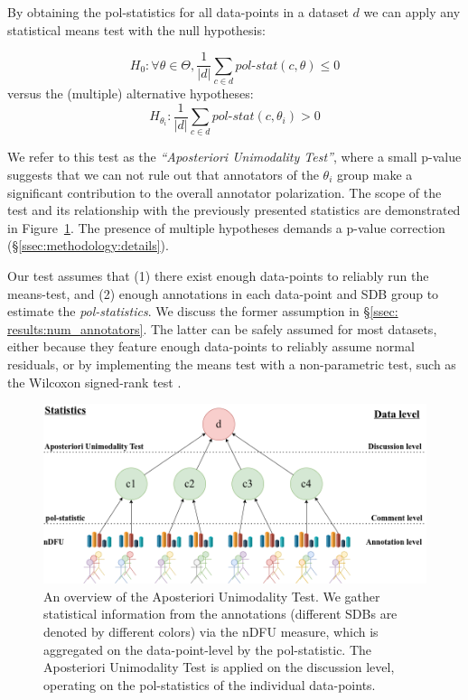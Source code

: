 \documentclass{article}
\begin{document}
By obtaining the pol-statistics for all data-points in a dataset $d$ we can apply any statistical means test with the null hypothesis:

\begin{equation}
	\label{eq:null_h}
	H_0: \forall \theta \in \Theta, \frac{1}{\lvert d \rvert} \sum\limits_{c \in d} \textit{pol-stat}(c, \theta) \le 0
\end{equation}
\noindent versus the (multiple) alternative hypotheses: 
\begin{equation}
	\label{eq:alt_h}
	H_{\theta_i}:\frac{1}{\lvert d \rvert} \sum\limits_{c \in d} \textit{pol-stat}(c, \theta_i) >  0
\end{equation}

We refer to this test as the \textit{``Aposteriori Unimodality Test''}, where a small p-value suggests that we can not rule out that annotators of the $\theta_i$ group make a significant contribution to the overall annotator polarization. The scope of the test and its relationship with the previously presented statistics are demonstrated in Figure~\ref{fig::overview}. The presence of multiple hypotheses demands a p-value correction (\S\ref{ssec:methodology:details}).

Our test assumes that (1) there exist enough data-points to reliably run the means-test, and (2) enough annotations in each data-point and \ac{SDB} group to estimate the \textit{pol-statistics}. We discuss the former assumption in \S\ref{ssec: results:num_annotators}. The latter can be safely assumed for most datasets, either because they feature enough data-points to reliably assume normal residuals, or by implementing the means test with a non-parametric test, such as the Wilcoxon signed-rank test \parencite{wilcoxon-1945}.

\begin{figure}
	\includegraphics[width=\linewidth]{overview.png}
	\caption{An overview of the Aposteriori Unimodality Test. We gather statistical information from the annotations (different \acp{SDB} are denoted by different colors) via the \ac{nDFU} measure, which is aggregated on the data-point-level by the pol-statistic. The Aposteriori Unimodality Test is applied on the discussion level, operating on the pol-statistics of the individual data-points.}
	\label{fig::overview}
\end{figure}
\end{document}
